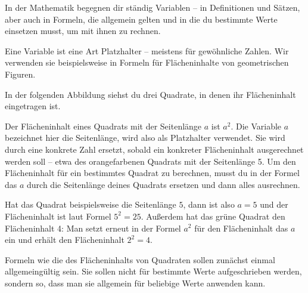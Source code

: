 \documentclass[../../main.tex]{subfiles}
\begin{document}
In der Mathematik begegnen dir ständig Variablen -- in Definitionen und Sätzen, aber auch in Formeln, die allgemein gelten und in die du bestimmte Werte einsetzen musst, um mit ihnen zu rechnen.

Eine Variable ist eine Art Platzhalter -- meistens für gewöhnliche Zahlen. Wir verwenden sie beispielsweise in Formeln für Flächeninhalte von geometrischen Figuren. 

\begin{example}{}
    In der folgenden Abbildung siehst du drei Quadrate, in denen ihr Flächeninhalt eingetragen ist.
    
        
    Der Flächeninhalt eines Quadrats mit der Seitenlänge $a$ ist $a^2$. Die Variable $a$ bezeichnet hier die Seitenlänge, wird also als Platzhalter verwendet. Sie wird durch eine konkrete Zahl ersetzt, sobald ein konkreter Flächeninhalt ausgerechnet werden soll -- etwa des orangefarbenen Quadrats mit der Seitenlänge 5. Um den Flächeninhalt für ein bestimmtes Quadrat zu berechnen, musst du in der Formel das $a$ durch die Seitenlänge deines Quadrats ersetzen und dann alles ausrechnen.
    
    Hat das Quadrat beispielsweise die Seitenlänge $5$, dann ist also $a=5$ und der Flächeninhalt ist laut Formel $5^2=25$. Außerdem hat das grüne Quadrat den Flächeninhalt 4: Man setzt erneut in der Formel $a^2$ für den Flächeninhalt das $a$ ein und erhält den Flächeninhalt $2^2=4$.
\end{example}

Formeln wie die des Flächeninhalts von Quadraten sollen zunächst einmal allgemeingültig sein. Sie sollen nicht für bestimmte Werte aufgeschrieben werden, sondern so, dass man sie allgemein für beliebige Werte anwenden kann.
\end{document}
